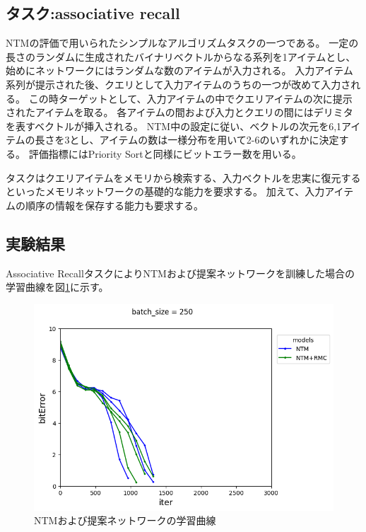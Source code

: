 
\subsection{タスク:associative recall}
NTM\cite{ntm}の評価で用いられたシンプルなアルゴリズムタスクの一つである。
一定の長さのランダムに生成されたバイナリベクトルからなる系列を1アイテムとし、
始めにネットワークにはランダムな数のアイテムが入力される。
入力アイテム系列が提示された後、クエリとして入力アイテムのうちの一つが改めて入力される。
この時ターゲットとして、入力アイテムの中でクエリアイテムの次に提示されたアイテムを取る。
各アイテムの間および入力とクエリの間にはデリミタを表すベクトルが挿入される。
NTM\cite{ntm}中の設定に従い、ベクトルの次元を6,1アイテムの長さを3とし、アイテムの数は一様分布を用いて2-6のいずれかに決定する。
評価指標にはPriority Sortと同様にビットエラー数を用いる。


タスクはクエリアイテムをメモリから検索する、入力ベクトルを忠実に復元するといったメモリネットワークの基礎的な能力を要求する。
加えて、入力アイテムの順序の情報を保存する能力も要求する。

\subsection{実験結果}
Associative RecallタスクによりNTMおよび提案ネットワークを訓練した場合の学習曲線を図\ref{fig:ntm,rmc_m12id3}に示す。
\begin{figure}[t]
	\centering
	\includegraphics[width=\linewidth]{./figure/associative/ntm,rmc_m12id3.png}
	\caption{NTMおよび提案ネットワークの学習曲線}
	\label{fig:ntm,rmc_m12id3}
\end{figure}

